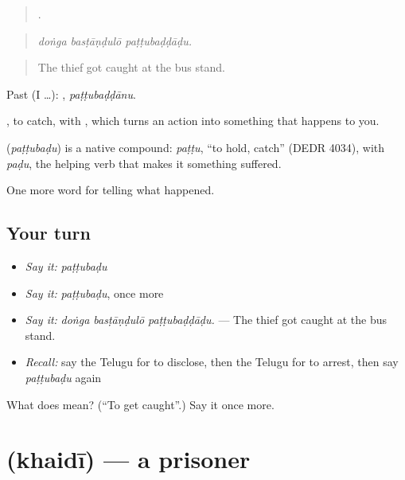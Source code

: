\begin{quote}
  .
\end{quote}

\begin{quote}
\emph{doṅga basṭāṇḍulō paṭṭubaḍḍāḍu.}
\end{quote}

\begin{quote}
The thief got caught at the bus stand.
\end{quote}

Past (I …): , \emph{paṭṭubaḍḍānu}.

, to catch, with , which turns an action into something that happens to you.

\begin{cousinweb}
\textbf{} (\emph{paṭṭubaḍu}) is a native compound: \emph{paṭṭu}, \textquotedblleft{}to hold, catch\textquotedblright{} (DEDR 4034), with \emph{paḍu}, the helping verb that makes it something suffered.
\end{cousinweb}

\begin{grammarlens}[title={What you've built}]
One more word for telling what happened.
\end{grammarlens}

\subsection*{Your turn}
\begin{itemize}
\raggedright
  \item \emph{Say it:} \emph{paṭṭubaḍu}
  \item \emph{Say it:} \emph{paṭṭubaḍu}, once more
  \item \emph{Say it:} \emph{doṅga basṭāṇḍulō paṭṭubaḍḍāḍu.} — The thief got caught at the bus stand.
  \item \emph{Recall:} say the Telugu for to disclose, then the Telugu for to arrest, then say \emph{paṭṭubaḍu} again
\end{itemize}

\begin{tcolorbox}[breakable,colback=teal!4,colframe=teal!35!black,title={Before you move on}]
What does  mean? (\textquotedblleft{}To get caught\textquotedblright{}.) Say it once more.
\end{tcolorbox}
\section[\texorpdfstring{\te{ఖైదీ} (khaidī)}{ఖైదీ (khaidī)}]{ (khaidī) — a prisoner}

